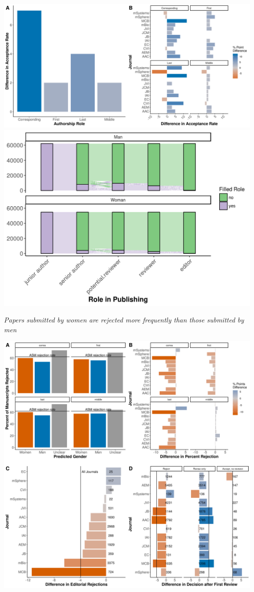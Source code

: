 \documentclass[11pt,]{article}
\begin{document}
\includegraphics{Figure_4.png} \includegraphics{Figure_5.png}

\emph{Papers submitted by women are rejected more frequently than those
submitted by men}

\includegraphics{Figure_6.png}
\end{document}
